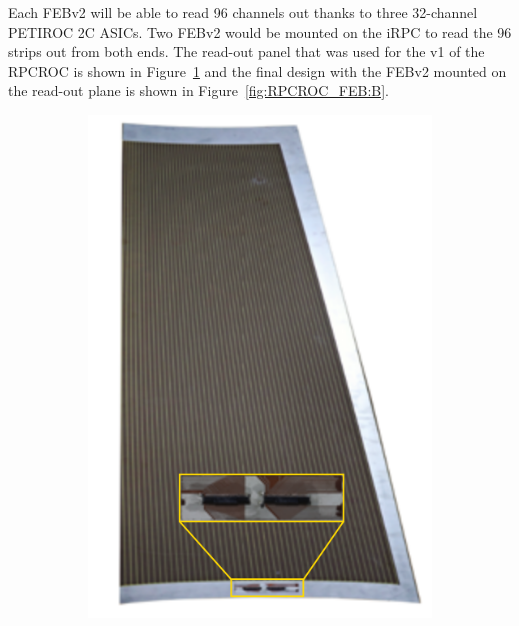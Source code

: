 	Each FEBv2 will be able to read 96 channels out thanks to three 32-channel PETIROC 2C ASICs. Two FEBv2 would be mounted on the iRPC to read the 96 strips out from both ends. The read-out panel that was used for the v1 of the RPCROC is shown in Figure~\ref{fig:RPCROC_FEB:A} and the final design with the FEBv2 mounted on the read-out plane is shown in Figure~\ref{fig:RPCROC_FEB:B}.

	\begin{figure}[H]
		\begin{subfigure}{0.4\linewidth}
		    \centering
			\includegraphics[width = \linewidth]{fig/chapt6/iRPC-RPCROC-PCB.png}
			\caption{\label{fig:RPCROC_FEB:A}}
		\end{subfigure}
		\begin{subfigure}{0.6\linewidth}
		    \centering

\end{subfigure}
\end{figure}
